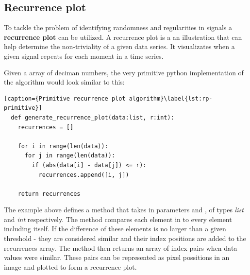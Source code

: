 \documentclass[a4paper,12pt,fleqn]{article}
\begin{document}
\subsection{Recurrence plot}
To tackle the problem of identifying randomness and regularities in signals a \textbf{recurrence plot} can be utilized.
A recurrence plot is a an illustration that can help determine the non-triviality of a given data series.
It visualizates when a given signal repeats for each moment in a time series.

Given a  array of deciman numbers, the very primitive python implementation of the algorithm would look similar to this:
\begin{lstlisting}[caption={Primitive recurrence plot algorithm}\label{lst:rp-primitive}]
  def generate_recurrence_plot(data:list, r:int):
    recurrences = []
    
    for i in range(len(data)):
      for j in range(len(data)):
        if (abs(data[i] - data[j]) <= r):
          recurrences.append([i, j])

    return recurrences
\end{lstlisting}
The example above defines a method  that takes in parameters  and , of types \emph{list} and \emph{int} respectively.
The method compares each element in  to every element including itself.
If the difference of these elements is no larger than a given threshold  - they are considered similar and their index positions are added to the recurrences array.
The method then returns an array of index pairs when data values were similar.
These pairs can be represented as pixel possitions in an image and plotted to form a recurrence plot.
\end{document}
